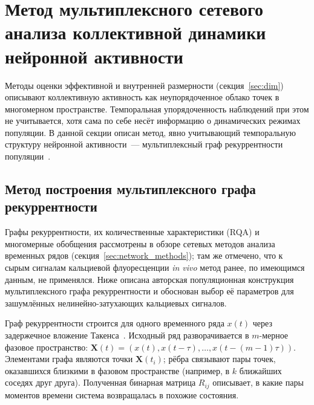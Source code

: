 
\section{Метод мультиплексного сетевого анализа коллективной динамики нейронной активности}\label{sec:v2}

Методы оценки эффективной и внутренней размерности (секция~\ref{sec:dim}) описывают коллективную активность как неупорядоченное облако точек в многомерном пространстве. Темпоральная упорядоченность наблюдений при этом не учитывается, хотя сама по себе несёт информацию о динамических режимах популяции. В данной секции описан метод, явно учитывающий темпоральную структуру нейронной активности~--- мультиплексный граф рекуррентности популяции~\cite{Pospelov2024cns}.


\subsection{Метод построения мультиплексного графа рекуррентности}\label{sec:v2_method}

Графы рекуррентности, их количественные характеристики (RQA) и многомерные обобщения рассмотрены в обзоре сетевых методов анализа временных рядов (секция~\ref{sec:network_methods}); там же отмечено, что к сырым сигналам кальциевой флуоресценции \textit{in vivo} метод ранее, по имеющимся данным, не применялся. Ниже описана авторская популяционная конструкция мультиплексного графа рекуррентности и обоснован выбор её параметров для зашумлённых нелинейно-затухающих кальциевых сигналов.

Граф рекуррентности строится для одного временного ряда $x(t)$ через задержечное вложение Такенса~\cite{Takens1981}. Исходный ряд разворачивается в $m$-мерное фазовое пространство: $\mathbf{X}(t) = (x(t), x(t-\tau), \ldots, x(t-(m-1)\tau))$. Элементами графа являются точки $\mathbf{X}(t_i)$; рёбра связывают пары точек, оказавшихся близкими в фазовом пространстве (например, в $k$ ближайших соседях друг друга). Полученная бинарная матрица $R_{ij}$ описывает, в какие пары моментов времени система возвращалась в похожие состояния.

